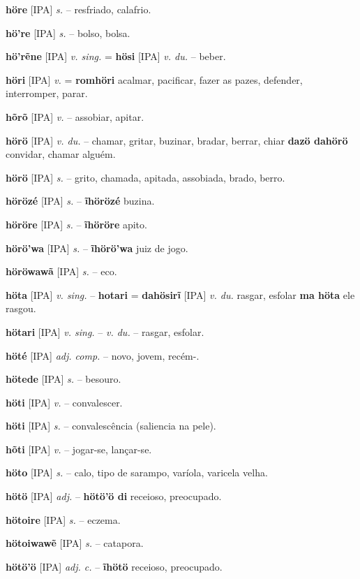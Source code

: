 \textbf{höre} [IPA] \textit{s.} -- resfriado, calafrio.

\textbf{hö're} [IPA] \textit{s.} -- bolso, bolsa.

\textbf{hö'rẽne} [IPA] \textit{v. sing.} = \textbf{hösi} [IPA] \textit{v. du.} -- beber.

\textbf{höri} [IPA] \textit{v.} = \textbf{romhöri} acalmar, pacificar, fazer as pazes, defender, interromper, parar.

\textbf{hõrõ} [IPA] \textit{v.} -- assobiar, apitar.

\textbf{hörö} [IPA] \textit{v. du.} -- chamar, gritar, buzinar, bradar, berrar, chiar  \textbf{dazö dahörö} convidar, chamar alguém.

\textbf{hörö} [IPA] \textit{s.} -- grito, chamada, apitada, assobiada, brado, berro.

\textbf{hörözé} [IPA] \textit{s.} -- \textbf{ĩhörözé} buzina.

\textbf{höröre} [IPA] \textit{s.} -- \textbf{ĩhöröre} apito.

\textbf{hörö'wa} [IPA] \textit{s.} -- \textbf{ĩhörö'wa} juiz de jogo.

\textbf{höröwawã} [IPA] \textit{s.} -- eco.

\textbf{höta} [IPA] \textit{v. sing.} -- \textbf{hotari} = \textbf{dahösirĩ} [IPA] \textit{v. du.} rasgar, esfolar  \textbf{ma höta} ele rasgou.

\textbf{hötari} [IPA] \textit{v. sing.} -- \textit{v. du.} -- rasgar, esfolar.

\textbf{höté} [IPA] \textit{adj. comp.} -- novo, jovem, recém-.

\textbf{hötede} [IPA] \textit{s.} -- besouro.

\textbf{höti} [IPA] \textit{v.} -- convalescer.

\textbf{höti} [IPA] \textit{s.} -- convalescência (saliencia na pele).

\textbf{hõti} [IPA] \textit{v.} -- jogar-se, lançar-se.

\textbf{höto} [IPA] \textit{s.} -- calo, tipo de sarampo, varíola, varicela velha.

\textbf{hötö} [IPA] \textit{adj.} -- \textbf{hötö'ö di} receioso, preocupado.

\textbf{hötoire} [IPA] \textit{s.} -- eczema.

\textbf{hötoiwawẽ} [IPA] \textit{s.} -- catapora.

\textbf{hötö'ö} [IPA] \textit{adj. c.} -- \textbf{ĩhötö} receioso, preocupado.

